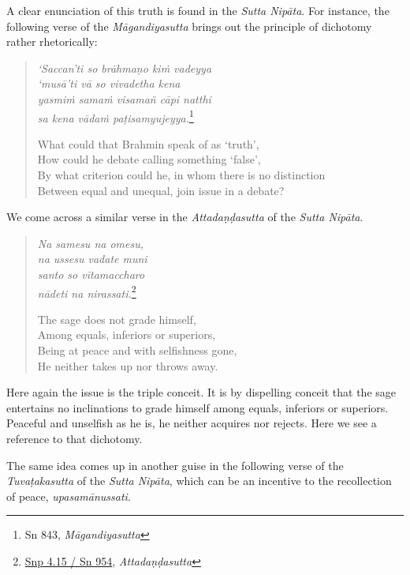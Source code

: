 A clear enunciation of this truth is found in the \emph{Sutta Nipāta}. For instance, the following verse of the \emph{Māgandiyasutta} brings out the principle of dichotomy rather rhetorically:

\begin{quote}
\emph{`Saccan'ti so brāhmaṇo kiṁ vadeyya}\\
\emph{`musā'ti vā so vivadetha kena}\\
\emph{yasmiṁ samaṁ visamañ cāpi natthi}\\
\emph{sa kena vādaṁ paṭisamyujeyya.}\footnote{Sn 843, \emph{Māgandiyasutta}}

What could that Brahmin speak of as `truth',\\
How could he debate calling something `false',\\
By what criterion could he, in whom there is no distinction\\
Between equal and unequal, join issue in a debate?
\end{quote}

We come across a similar verse in the \emph{Attadaṇḍasutta} of the \emph{Sutta Nipāta}.

\begin{quote}
\emph{Na samesu na omesu,}\\
\emph{na ussesu vadate muni}\\
\emph{santo so vītamaccharo}\\
\emph{nādeti na nirassati.}\footnote{\href{https://suttacentral.net/snp4.15/pli/ms}{Snp 4.15 / Sn 954}, \emph{Attadaṇḍasutta}}

The sage does not grade himself,\\
Among equals, inferiors or superiors,\\
Being at peace and with selfishness gone,\\
He neither takes up nor throws away.
\end{quote}

Here again the issue is the triple conceit. It is by dispelling conceit that the sage entertains no inclinations to grade himself among equals, inferiors or superiors. Peaceful and unselfish as he is, he neither acquires nor rejects. Here we see a reference to that dichotomy.

The same idea comes up in another guise in the following verse of the \emph{Tuvaṭakasutta} of the \emph{Sutta Nipāta}, which can be an incentive to the recollection of peace, \emph{upasamānussati}.

\clearpage


